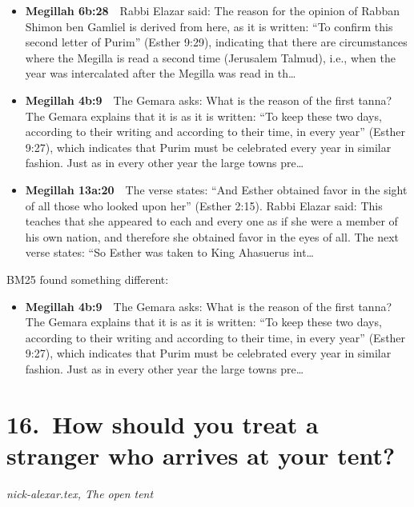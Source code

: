 \documentclass[11pt,a4paper]{article}
\begin{document}
\begin{itemize}[leftmargin=1.2em,itemsep=3pt]
\item {\color{ref}\textbf{Megillah 6b:28}}\ \ Rabbi Elazar said: The reason for the opinion of Rabban Shimon ben Gamliel is derived from here, as it is written: “To confirm this second letter of Purim” (Esther 9:29), indicating that there are circumstances where the Megilla is read a second time (Jerusalem Talmud), i.e., when the year was intercalated after the Megilla was read in th\ldots
\item {\color{ref}\textbf{Megillah 4b:9}}\ \ The Gemara asks: What is the reason of the first tanna? The Gemara explains that it is as it is written: “To keep these two days, according to their writing and according to their time, in every year” (Esther 9:27), which indicates that Purim must be celebrated every year in similar fashion. Just as in every other year the large towns pre\ldots
\item {\color{ref}\textbf{Megillah 13a:20}}\ \ The verse states: “And Esther obtained favor in the sight of all those who looked upon her” (Esther 2:15). Rabbi Elazar said: This teaches that she appeared to each and every one as if she were a member of his own nation, and therefore she obtained favor in the eyes of all. The next verse states: “So Esther was taken to King Ahasuerus int\ldots
\end{itemize}
{\color{quiet}\small BM25 found something different:}
\begin{itemize}[leftmargin=1.2em]
\item {\color{ref}\textbf{Megillah 4b:9}}\ \ The Gemara asks: What is the reason of the first tanna? The Gemara explains that it is as it is written: “To keep these two days, according to their writing and according to their time, in every year” (Esther 9:27), which indicates that Purim must be celebrated every year in similar fashion. Just as in every other year the large towns pre\ldots
\end{itemize}

\section*{16.\ How should you treat a stranger who arrives at your tent?}
{\color{quiet}\small\textit{nick-alexar.tex, The open tent}}
\end{document}
